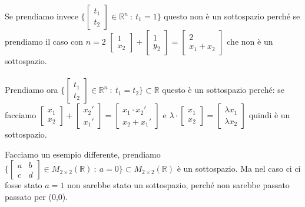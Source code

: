 \begin{example}
Se prendiamo invece $\Bigg \{\begin{bmatrix}t_1\\ t_2\end{bmatrix} \in \mathbb{R}^n \: : \: t_1 = 1\Bigg\}$ questo non è un sottospazio perché se prendiamo il caso con $n=2$ $\begin{bmatrix}1\\x_2\end{bmatrix} + \begin{bmatrix}1\\y_2\end{bmatrix} = \begin{bmatrix}2\\x_1 + x_2\end{bmatrix}$ che non è un sottospazio.\\\\
Prendiamo ora $\Bigg \{\begin{bmatrix}t_1\\ t_2\end{bmatrix} \in \mathbb{R}^n \: : \: t_1 = t_2\Bigg\} \subset \mathbb{R}$ questo è un sottospazio perché:
se facciamo $\begin{bmatrix}x_1\\x_2\end{bmatrix} + \begin{bmatrix}x_2'\\x_1'\end{bmatrix} = \begin{bmatrix}x_1 \cdot x_2'\\x_2 + x_1'\end{bmatrix}$ e $\lambda \cdot\begin{bmatrix}x_1 \\ x_2\end{bmatrix} = \begin{bmatrix}\lambda x_1 \\ \lambda x_2\end{bmatrix}$ quindi è un sottospazio.
\end{example}

\begin{example}
Facciamo un esempio differente, prendiamo $\Bigg\{\begin{bmatrix}a & b \\ c & d\end{bmatrix} \in M_{2\times 2}(\mathbb{R})\: :\: a= 0 \Bigg\}\subset M_{2 \times 2}(\mathbb{R})$ è un sottospazio. Ma nel caso ci ci fosse stato $a=1$ non sarebbe stato un sottospazio, perché non sarebbe passato passato per (0,0).
\end{example}

